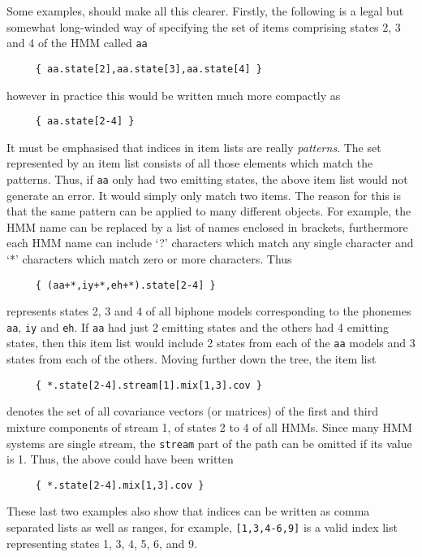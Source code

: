 Some examples, should make all this clearer.  Firstly, the
following is a legal but somewhat long-winded way of specifying
the set of items comprising states 2, 3 and 4 of the HMM called \texttt{aa}
\begin{verbatim}
     { aa.state[2],aa.state[3],aa.state[4] }
\end{verbatim}
however in practice this would be written much more compactly as
\begin{verbatim}
     { aa.state[2-4] }
\end{verbatim}
It must be emphasised that indices in item lists are really {\it patterns}.
The set represented by an item list consists of all those elements which
match the patterns.  Thus, if \texttt{aa} only had two emitting states, the above item
list would not generate an error.  It would simply only match two items.
The reason for this is that the same pattern can be applied to many different
objects.  For example, the HMM name can be replaced by a list of names 
enclosed in brackets, furthermore each HMM name can include `?' characters
which match any single character and `*' characters which match zero or
more characters.  Thus 
\begin{verbatim}
     { (aa+*,iy+*,eh+*).state[2-4] }
\end{verbatim}
represents states 2, 3 and 4  
of all biphone models corresponding to
the phonemes \texttt{aa}, \texttt{iy} and \texttt{eh}.  If \texttt{aa} had just 2 emitting
states and the others had 4 emitting states, then this item list would include
2 states from each of the \texttt{aa} models and 3 states from
each of the others.  Moving further down the tree, the item list
\begin{verbatim}
     { *.state[2-4].stream[1].mix[1,3].cov }
\end{verbatim}
denotes the set of all covariance vectors (or matrices) of the first and
third mixture
components of stream 1, of states 2 to 4 of all HMMs.  Since many HMM systems
are single stream, the \texttt{stream} part of the path can be omitted if its value
is 1.  Thus, the above could have been written
\begin{verbatim}
     { *.state[2-4].mix[1,3].cov }
\end{verbatim}
These last two examples also show that indices can be written as comma
separated lists as well as ranges, for example, \texttt{[1,3,4-6,9]}
is a valid index list representing states 1, 3, 4, 5, 6, and 9.

